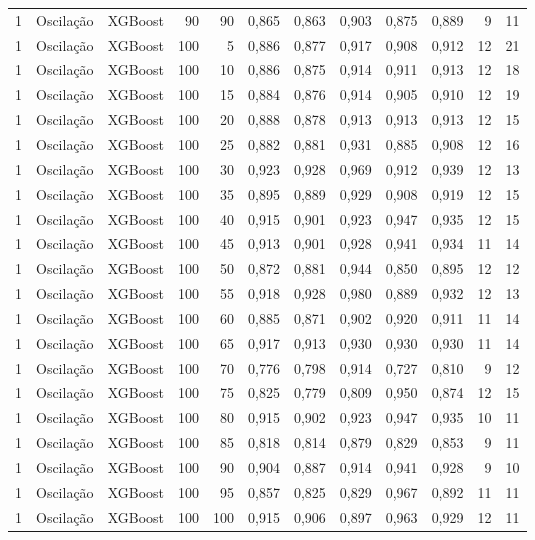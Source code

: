 \begin{longtable}{@{}rllrrrrrrrrr@{}}
1 & Oscilação & XGBoost & 90 & 90 & 0,865 & 0,863 & 0,903 & 0,875 & 0,889 & 9 & 11 \\
1 & Oscilação & XGBoost & 100 & 5 & 0,886 & 0,877 & 0,917 & 0,908 & 0,912 & 12 & 21 \\
1 & Oscilação & XGBoost & 100 & 10 & 0,886 & 0,875 & 0,914 & 0,911 & 0,913 & 12 & 18 \\
1 & Oscilação & XGBoost & 100 & 15 & 0,884 & 0,876 & 0,914 & 0,905 & 0,910 & 12 & 19 \\
1 & Oscilação & XGBoost & 100 & 20 & 0,888 & 0,878 & 0,913 & 0,913 & 0,913 & 12 & 15 \\
1 & Oscilação & XGBoost & 100 & 25 & 0,882 & 0,881 & 0,931 & 0,885 & 0,908 & 12 & 16 \\
1 & Oscilação & XGBoost & 100 & 30 & 0,923 & 0,928 & 0,969 & 0,912 & 0,939 & 12 & 13 \\
1 & Oscilação & XGBoost & 100 & 35 & 0,895 & 0,889 & 0,929 & 0,908 & 0,919 & 12 & 15 \\
1 & Oscilação & XGBoost & 100 & 40 & 0,915 & 0,901 & 0,923 & 0,947 & 0,935 & 12 & 15 \\
1 & Oscilação & XGBoost & 100 & 45 & 0,913 & 0,901 & 0,928 & 0,941 & 0,934 & 11 & 14 \\
1 & Oscilação & XGBoost & 100 & 50 & 0,872 & 0,881 & 0,944 & 0,850 & 0,895 & 12 & 12 \\
1 & Oscilação & XGBoost & 100 & 55 & 0,918 & 0,928 & 0,980 & 0,889 & 0,932 & 12 & 13 \\
1 & Oscilação & XGBoost & 100 & 60 & 0,885 & 0,871 & 0,902 & 0,920 & 0,911 & 11 & 14 \\
1 & Oscilação & XGBoost & 100 & 65 & 0,917 & 0,913 & 0,930 & 0,930 & 0,930 & 11 & 14 \\
1 & Oscilação & XGBoost & 100 & 70 & 0,776 & 0,798 & 0,914 & 0,727 & 0,810 & 9 & 12 \\
1 & Oscilação & XGBoost & 100 & 75 & 0,825 & 0,779 & 0,809 & 0,950 & 0,874 & 12 & 15 \\
1 & Oscilação & XGBoost & 100 & 80 & 0,915 & 0,902 & 0,923 & 0,947 & 0,935 & 10 & 11 \\
1 & Oscilação & XGBoost & 100 & 85 & 0,818 & 0,814 & 0,879 & 0,829 & 0,853 & 9 & 11 \\
1 & Oscilação & XGBoost & 100 & 90 & 0,904 & 0,887 & 0,914 & 0,941 & 0,928 & 9 & 10 \\
1 & Oscilação & XGBoost & 100 & 95 & 0,857 & 0,825 & 0,829 & 0,967 & 0,892 & 11 & 11 \\
1 & Oscilação & XGBoost & 100 & 100 & 0,915 & 0,906 & 0,897 & 0,963 & 0,929 & 12 & 11 \\

\end{longtable}
